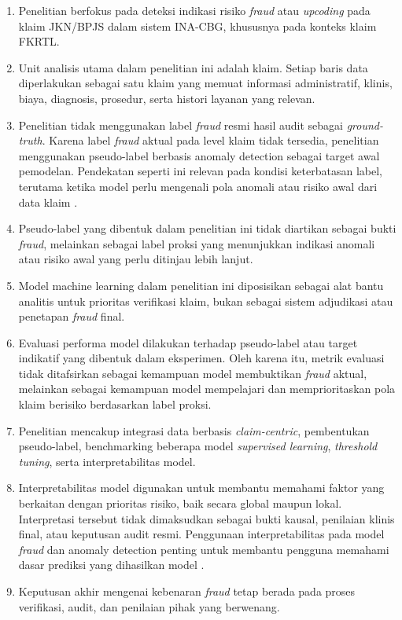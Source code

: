 \begin{enumerate}[label=\arabic*., leftmargin=*]
  \item Penelitian berfokus pada deteksi indikasi risiko \textit{fraud} atau \textit{upcoding} pada klaim JKN/BPJS dalam sistem INA-CBG, khususnya pada konteks klaim FKRTL.
  \item Unit analisis utama dalam penelitian ini adalah klaim. Setiap baris data diperlakukan sebagai satu klaim yang memuat informasi administratif, klinis, biaya, diagnosis, prosedur, serta histori layanan yang relevan.
  \item Penelitian tidak menggunakan label \textit{fraud} resmi hasil audit sebagai \textit{ground-truth}. Karena label \textit{fraud} aktual pada level klaim tidak tersedia, penelitian menggunakan pseudo-label berbasis anomaly detection sebagai target awal pemodelan. Pendekatan seperti ini relevan pada kondisi keterbatasan label, terutama ketika model perlu mengenali pola anomali atau risiko awal dari data klaim \citep{shekhar2023,meulemeester2025,bakker2025}.
  \item Pseudo-label yang dibentuk dalam penelitian ini tidak diartikan sebagai bukti \textit{fraud}, melainkan sebagai label proksi yang menunjukkan indikasi anomali atau risiko awal yang perlu ditinjau lebih lanjut.
  \item Model machine learning dalam penelitian ini diposisikan sebagai alat bantu analitis untuk prioritas verifikasi klaim, bukan sebagai sistem adjudikasi atau penetapan \textit{fraud} final.
  \item Evaluasi performa model dilakukan terhadap pseudo-label atau target indikatif yang dibentuk dalam eksperimen. Oleh karena itu, metrik evaluasi tidak ditafsirkan sebagai kemampuan model membuktikan \textit{fraud} aktual, melainkan sebagai kemampuan model mempelajari dan memprioritaskan pola klaim berisiko berdasarkan label proksi.
  \item Penelitian mencakup integrasi data berbasis \textit{claim-centric}, pembentukan pseudo-label, benchmarking beberapa model \textit{supervised learning}, \textit{threshold tuning}, serta interpretabilitas model.
  \item Interpretabilitas model digunakan untuk membantu memahami faktor yang berkaitan dengan prioritas risiko, baik secara global maupun lokal. Interpretasi tersebut tidak dimaksudkan sebagai bukti kausal, penilaian klinis final, atau keputusan audit resmi. Penggunaan interpretabilitas pada model \textit{fraud} dan anomaly detection penting untuk membantu pengguna memahami dasar prediksi yang dihasilkan model \citep{wang2025,ribeiro2016,lundberg2017,salih2025}.
  \item Keputusan akhir mengenai kebenaran \textit{fraud} tetap berada pada proses verifikasi, audit, dan penilaian pihak yang berwenang.
\end{enumerate}

